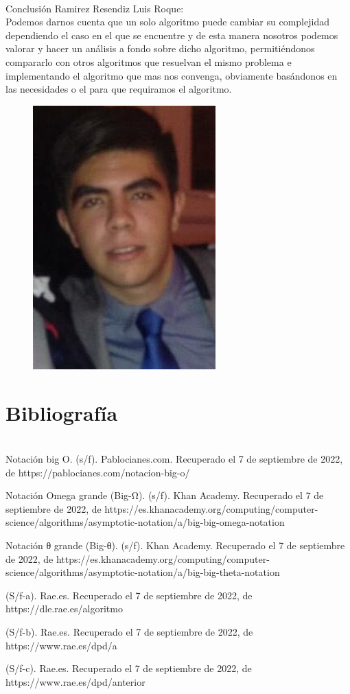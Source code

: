 \documentclass[12pt,twoside]{article}
\begin{document}
\\
Conclusión Ramirez Resendiz Luis Roque:\\
Podemos darnos cuenta que un solo algoritmo puede cambiar su complejidad dependiendo el caso en el que se encuentre y de esta manera nosotros podemos valorar y hacer un análisis a fondo sobre dicho algoritmo, permitiéndonos compararlo con otros algoritmos que resuelvan el mismo problema e implementando el algoritmo que mas nos convenga, obviamente basándonos en las necesidades o el para que requiramos el algoritmo.
\begin{figure}[h!]
\centering
\includegraphics[scale=0.7]{luis1.jpg}
\caption{}
\label{fig:universe}
\end{figure}

\section{Bibliograf\'ia}
\\
Notación big O. (s/f). Pablocianes.com. Recuperado el 7 de septiembre de 2022, de https://pablocianes.com/notacion-big-o/

Notación Omega grande (Big-Ω). (s/f). Khan Academy. Recuperado el 7 de septiembre de 2022, de https://es.khanacademy.org/computing/computer-science/algorithms/asymptotic-notation/a/big-big-omega-notation

Notación θ grande (Big-θ). (s/f). Khan Academy. Recuperado el 7 de septiembre de 2022, de https://es.khanacademy.org/computing/computer-science/algorithms/asymptotic-notation/a/big-big-theta-notation

(S/f-a). Rae.es. Recuperado el 7 de septiembre de 2022, de https://dle.rae.es/algoritmo

(S/f-b). Rae.es. Recuperado el 7 de septiembre de 2022, de https://www.rae.es/dpd/a%

(S/f-c). Rae.es. Recuperado el 7 de septiembre de 2022, de https://www.rae.es/dpd/anterior

\medskip
\end{document}
